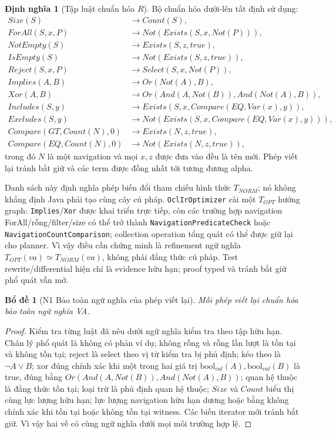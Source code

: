 \documentclass[11pt,a4paper]{article}
\newtheorem{lemma}{Bổ đề}
\theoremstyle{definition}
\newtheorem{definition}{Định nghĩa}
\newcommand{\boolval}{\mathrm{bool}_{val}}
\begin{document}
\begin{definition}[Tập luật chuẩn hóa $R$]
Bộ chuẩn hóa dưới-lên tất định sử dụng:
\begin{align*}
Size(S)&\to Count(S),\\
ForAll(S,x,P)&\to Not(Exists(S,x,Not(P))),\\
NotEmpty(S)&\to Exists(S,z,true),\\
IsEmpty(S)&\to Not(Exists(S,z,true)),\\
Reject(S,x,P)&\to Select(S,x,Not(P)),\\
Implies(A,B)&\to Or(Not(A),B),\\
Xor(A,B)&\to Or(And(A,Not(B)),And(Not(A),B)),\\
Includes(S,y)&\to Exists(S,x,Compare(EQ,Var(x),y)),\\
Excludes(S,y)&\to Not(Exists(S,x,Compare(EQ,Var(x),y))),\\
Compare(GT,Count(N),0)&\to Exists(N,z,true),\\
Compare(EQ,Count(N),0)&\to Not(Exists(N,z,true)),
\end{align*}
trong đó $N$ là một navigation và mọi $x,z$ được đưa vào đều là tên mới. Phép
viết lại tránh bắt giữ và các term được đồng nhất tới tương đương alpha.
\end{definition}

Danh sách này định nghĩa phép biến đổi tham chiếu hình thức $T_{NORM}$; nó không
khẳng định Java phải tạo cùng cây cú pháp. \texttt{OclIrOptimizer} cài một
$T_{OPT}$ hướng graph: \texttt{Implies}/\texttt{Xor} được khai triển trực tiếp,
còn các trường hợp navigation ForAll/rỗng/filter/size có thể trở thành
\texttt{NavigationPredicateCheck} hoặc \texttt{NavigationCountComparison};
collection operation tổng quát có thể được giữ lại cho planner. Vì vậy điều
cần chứng minh là refinement ngữ nghĩa $T_{OPT}(va)\simeq T_{NORM}(va)$, không
phải đẳng thức cú pháp. Test rewrite/differential hiện chỉ là evidence hữu hạn;
proof typed và tránh bắt giữ phổ quát vẫn mở.

\begin{lemma}[N1 Bảo toàn ngữ nghĩa của phép viết lại]
Mỗi phép viết lại chuẩn hóa bảo toàn ngữ nghĩa VA.
\end{lemma}
\begin{proof}
Kiểm tra từng luật đã nêu dưới ngữ nghĩa kiểm tra theo tập hữu hạn. Chân lý phổ
quát là không có phản ví dụ; không rỗng và rỗng lần lượt là tồn tại và không
tồn tại; reject là select theo vị từ kiểm tra bị phủ định; kéo theo là
$\neg A\lor B$; xor đúng chính xác khi một trong hai giá trị
$\boolval(A),\boolval(B)$ là true, đúng bằng
$Or(And(A,Not(B)),And(Not(A),B))$; quan hệ thuộc là đẳng thức tồn tại; loại trừ là phủ định quan
hệ thuộc; $Size$ và $Count$ biểu thị cùng lực lượng hữu hạn; lực lượng
navigation hữu hạn dương hoặc bằng không chính xác khi tồn tại hoặc không tồn
tại witness. Các biến iterator mới tránh bắt giữ. Vì vậy hai vế có cùng ngữ
nghĩa dưới mọi môi trường hợp lệ.
\end{proof}
\end{document}
